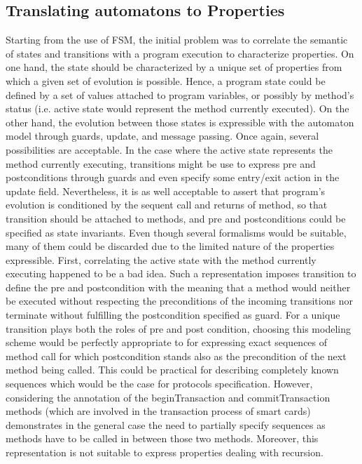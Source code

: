 \subsection{Translating automatons to Properties}
Starting from the use of FSM, the initial problem was to correlate the semantic of states and transitions with a program execution to characterize properties. On one hand, the state should be characterized by a unique set of properties from which a given set of evolution is possible. Hence, a program state could be defined by a set of values attached to program variables, or possibly by method's status (i.e. active state would represent the method currently executed). On the other hand, the evolution between those states is expressible with the automaton model through guards, update, and message passing. Once again, several possibilities are acceptable. In the case where the active state represents the method currently executing, transitions might be use to express pre and postconditions through guards and even specify some entry/exit action in the update field. Nevertheless, it is as well acceptable to assert that program's evolution is conditioned by the sequent call and returns of method, so that transition should be attached to methods, and pre and postconditions could be specified as state invariants.
Even though several formalisms would be suitable, many of them could be discarded due to the limited nature of the properties expressible. First, correlating the active state with the method currently executing happened to be a bad idea. Such a representation imposes transition to define the pre and postcondition with the meaning that a method would neither be executed without respecting the preconditions of the incoming transitions nor terminate without fulfilling the postcondition specified as guard. For a unique transition plays both the roles of pre and post condition, choosing this modeling scheme would be perfectly appropriate to for expressing exact sequences of method call for which postcondition stands also as the precondition of the next method being called. This could be practical for describing completely known sequences which would be the case for protocols specification. However, considering the annotation of the beginTransaction and commitTransaction methods (which are involved in the transaction process of smart cards) demonstrates in the general case the need to partially specify sequences as methods have to be called in between those two methods. Moreover, this representation is not suitable to express properties dealing with recursion.
